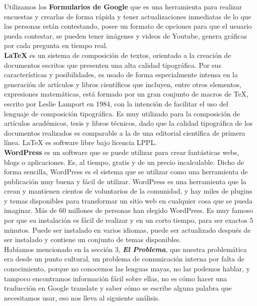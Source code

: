 \documentclass[a4paper,openright,11pt]{article}
\begin{document}
Utilizamos los \textbf{Formularios de Google} que es una herramienta para realizar encuestas y crearlas de forma rápida y tener actualizaciones inmediatas de lo que las personas están contestando, posee un formato de opciones para que el usuario pueda contestar, se pueden tener imágenes y videos de Youtube, genera gráficas por cada pregunta en tiempo real.\\

\textbf{\LaTeX} \hspace{0.1cm} es un sistema de composición de textos, orientado a la creación de documentos escritos que presenten una alta calidad tipográfica. Por sus características y posibilidades, es usado de forma especialmente intensa en la generación de artículos y libros científicos que incluyen, entre otros elementos, expresiones matemáticas, está formado por un gran conjunto de macros de TeX, escrito por Leslie Lamport en 1984, con la intención de facilitar el uso del lenguaje de composición tipográfica. Es muy utilizado para la composición de artículos académicos, tesis y libros técnicos, dado que la calidad tipográfica de los documentos realizados es comparable a la de una editorial científica de primera línea. \LaTeX \hspace{0.1cm} es software libre bajo licencia LPPL.\\

\textbf{WordPress} es un software que se puede utilizar para crear fantásticas webs, blogs o aplicaciones. Es, al tiempo, gratis y de un precio incalculable. Dicho de forma sencilla, WordPress es el sistema que se utilizar como una herramienta de publicación muy buena y fácil de utilizar. WordPress es una herramienta que la crean y mantienen cientos de voluntarios de la comunidad, y hay miles de plugins y temas disponibles para transformar un sitio web en cualquier cosa que se pueda imaginar. Más de 60 millones de personas han elegido WordPress. Es muy famoso por que su instalación es fácil de realizar y en un corto tiempo, para ser exactos 5 minutos. Puede ser instalado en varios idiomas, puede ser actualizado después de ser instalado y contiene un conjunto de temas disponibles.\\

Habíamos mencionado en la sección 3, \textbf{\textit{El Problema}}, que nuestra problemática era desde un punto cultural, un problema de comunicación interna por falta de conocimiento, porque no conocemos las lenguas mayas, no las podemos hablar, y tampoco encontramos información fácil sobre ellas, no es cómo hacer una traducción en Google translate y saber cómo se escribe alguna palabra que necesitamos usar, eso nos lleva al siguiente análisis. \\
\newpage
\end{document}
